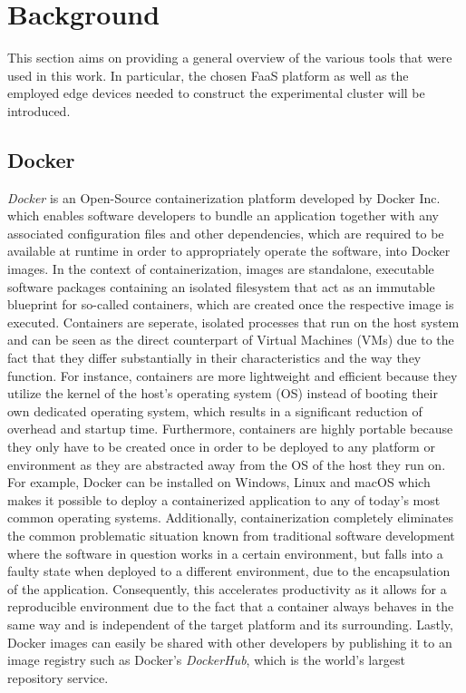 \chapter{Background}\label{chapter:background}

This section aims on providing a general overview of the various tools that were used in this work. In particular, the chosen FaaS platform as well as the employed edge devices needed to construct the experimental cluster will be introduced.

\section{Docker}
\textit{Docker} is an Open-Source containerization platform developed by Docker Inc. which enables software developers to bundle an application together with any associated configuration files and other dependencies, which are required to be available at runtime in order to appropriately operate the software, into Docker images. In the context of containerization, images are standalone, executable software packages containing an isolated filesystem that act as an immutable blueprint for so-called containers, which are created once the respective image is executed. Containers are seperate, isolated processes that run on the host system and can be seen as the direct counterpart of Virtual Machines (VMs) due to the fact that they differ substantially in their characteristics and the way they function. For instance, containers are more lightweight and efficient because they utilize the kernel of the host's operating system (OS) instead of booting their own dedicated operating system, which results in a significant reduction of overhead and startup time. Furthermore, containers are highly portable because they only have to be created once in order to be deployed to any platform or environment as they are abstracted away from the OS of the host they run on. For example, Docker can be installed on Windows, Linux and macOS which makes it possible to deploy a containerized application to any of today's most common operating systems. Additionally, containerization completely eliminates the common problematic situation known from traditional software development where the software in question works in a certain environment, but falls into a faulty state when deployed to a different environment, due to the encapsulation of the application. Consequently, this accelerates productivity as it allows for a reproducible environment due to the fact that a container always behaves in the same way and is independent of the target platform and its surrounding. Lastly, Docker images can easily be shared with other developers by publishing it to an image registry such as Docker's \textit{DockerHub}, which is the world's largest repository service. 

